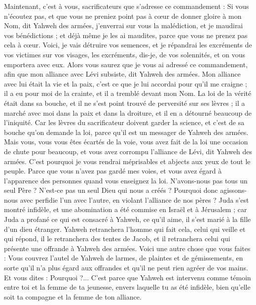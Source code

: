 \begin{multicols}{2}
\VerseOne{}Maintenant, c’est à vous, sacrificateurs que s'adresse ce commandement :
Si vous n'écoutez pas, et que vous ne preniez point pas à cœur de donner gloire à mon Nom, dit Yahweh des armées, j'enverrai sur vous la malédiction, et je maudirai vos bénédictions ; et déjà même je les ai maudites, parce que vous ne prenez pas cela à cœur.
Voici, je vais détruire vos semences, et je répandrai les excréments de vos victimes sur vos visages, les excréments, dis-je, de vos solennités, et on vous emportera avec eux.
Alors vous saurez que je vous ai adressé ce commandement, afin que mon alliance avec Lévi subsiste, dit Yahweh des armées.
Mon alliance avec lui était la vie et la paix, c’est ce que je lui accordai pour qu’il me craigne ; il a eu pour moi de la crainte, et il a tremblé devant mon Nom.
La loi de la vérité était dans sa bouche, et il ne s'est point trouvé de perversité sur ses lèvres ; il a marché avec moi dans la paix et dans la droiture, et il en a détourné beaucoup de l'iniquité.
Car les lèvres du sacrificateur doivent garder la science, et c’est de sa bouche qu’on demande la loi, parce qu'il est un messager de Yahweh des armées.
Mais vous, vous vous êtes écartés de la voie, vous avez fait de la loi une occasion de chute pour beaucoup, et vous avez corrompu l'alliance de Lévi, dit Yahweh des armées.
C'est pourquoi je vous rendrai méprisables et abjects aux yeux de tout le peuple. Parce que vous n’avez pas gardé mes voies, et vous avez égard à l'apparence des personnes quand vous enseignez la loi.
N'avons-nous pas tous un seul Père ? N’est-ce pas un seul Dieu qui nous a créés ? Pourquoi donc agissons-nous avec perfidie l’un avec l’autre, en violant l'alliance de nos pères ?
Juda s’est montré infidèle, et une abomination a été commise en Israël et à Jérusalem ; car Juda a profané ce qui est consacré à Yahweh, ce qu’il aime, il s'est marié à la fille d'un dieu étranger.
Yahweh retranchera l’homme qui fait cela, celui qui veille et qui répond, il le retranchera des tentes de Jacob, et il retranchera celui qui présente une offrande à Yahweh des armées.
Voici une autre chose que vous faites : Vous couvrez l'autel de Yahweh de larmes, de plaintes et de gémissements, en sorte qu’il n’a plus égard aux offrandes et qu’il ne peut rien agréer de vos mains.
Et vous dites : Pourquoi ?... C'est parce que Yahweh est intervenu comme témoin entre toi et la femme de ta jeunesse, envers laquelle tu as été infidèle, bien qu’elle soit ta compagne et la femme de ton alliance.

\end{multicols}
